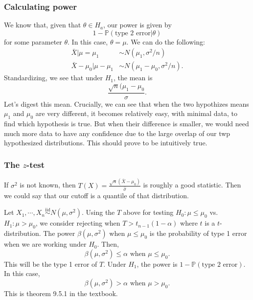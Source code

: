 \documentclass[titlepage, 12pt, leqno]{article}
\begin{document}
\subsubsection{Calculating power}
We know that, given that $\theta \in  H_{a}$, our power is given by
\[
1 - \mathbb{P}( \text{type 2 error} | \theta)
\]
for some parameter $\theta$. In this case, $\theta = \mu$. We can do the 
following:
\begin{align*}
    \bar X | \mu = \mu_{1} & \sim N(\mu_{1}, \sigma^{2}/n) \\
    \bar X - \mu_{0} | \mu - \mu_{1} & \sim  N(\mu_{1} - \mu_{0}, \sigma^{2}/n).
\end{align*}
Standardizing, we see that under $H_{1}$, the mean is
\[
    \frac{\sqrt{n}(\mu_{1} - \mu_{0}}{\sigma}.
\]
Let's digest this mean. Crucially, we can see that when the two hypothizes means
$\mu_{1}$ and $\mu_{0}$ are very different, it becomes relatively easy, with
minimal data, to find which hypothesis is true. But when their difference is
smaller, we would need much more data to have any confidence due to the
large overlap of our twp hypothesized distributions. This should prove to be
intuitively true.

\subsubsection{The $z$-test}
If $\sigma^{2}$ is not known, then $T(X) = \frac{\sqrt{n}(\bar X-\mu_{0})}{
\hat \sigma}$ is roughly a good statistic. Then we could say that our cutoff is
a quantile of that distribution.

\begin{definition}
    Let $X_{1}, \cdots ,X_{n} \overset{\mathrm{iid}}{\sim} N(\mu, \sigma^{2})$.
    Using the $T$ above for testing $H_{0}:\mu \le \mu_{0}$ vs. $H_{1} :
    \mu > \mu_{0}$, we consider rejecting when $T > t_{n-1}(1-\alpha)$ where
    $t$ is a $t$-distribution. The power $\beta(\mu, \sigma^{2})$ when
    $\mu \le \mu_{0}$ is the probability of type 1 error when we are working
    under $H_{0}$. Then,
    \[
    \beta(\mu, \sigma^{2}) \le \alpha \text{ when } \mu \le \mu_{0}.
    \]
    This will be the type 1 error of $T$. Under $H_{1}$, the power is 
    $1 - \mathbb{P}( \text{type 2 error})$. In this case,
    \[
    \beta(\mu, \sigma^{2}) > \alpha \text{ when } \mu > \mu_{0}.
    \]
    This is theorem 9.5.1 in the textbook.
\end{definition}
\end{document}
